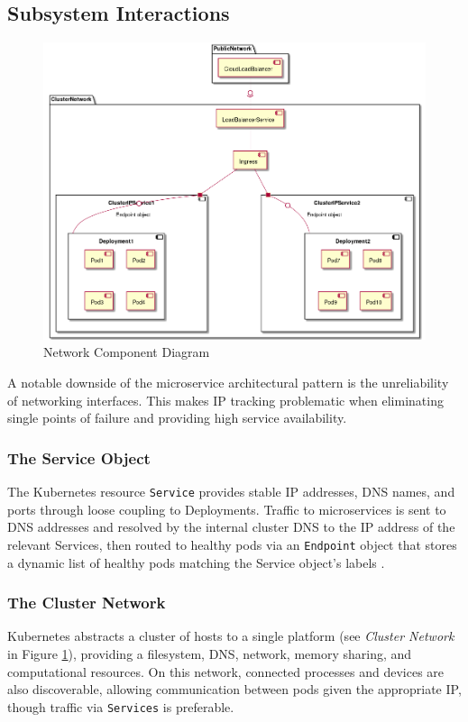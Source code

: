 \subsection{Subsystem Interactions}
\label{subsec:subsystem_interactions}
\begin{figure}[H]
    \centering
    \includegraphics[scale=.4]{images/networking-class.png}
    \caption{Network Component Diagram}
    \label{fig:network_components}
\end{figure}
A notable downside of the microservice architectural pattern is the unreliability of networking interfaces. This makes IP tracking problematic when eliminating single points of failure and providing high service availability.

\subsubsection{The Service Object}
The Kubernetes resource \texttt{Service} provides stable IP addresses, DNS names, and ports through loose coupling to Deployments.
Traffic to microservices is sent to DNS addresses and resolved by the internal cluster DNS to the IP address of the relevant Services, then routed to healthy pods via an \texttt{Endpoint} object that stores a dynamic list of healthy pods matching the Service object's labels \cite{k8sbook}.

\subsubsection{The Cluster Network}
Kubernetes abstracts a cluster of hosts to a single platform (see \textit{Cluster Network} in Figure \ref{fig:network_components}), providing a filesystem, DNS, network, memory sharing, and computational resources. On this network, connected processes and devices are also discoverable, allowing communication between pods given the appropriate IP, though traffic via \texttt{Services} is preferable.

